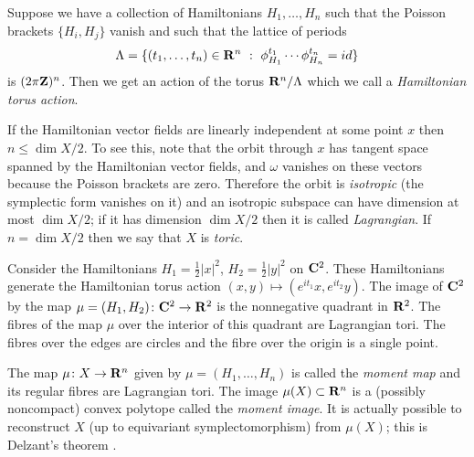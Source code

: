\documentclass{article}
\begin{document}
\begin{Definition}
Suppose we have a collection of Hamiltonians \(H_1,\ldots,H_n\) such
that the Poisson brackets \(\{H_i,H_j\}\) vanish and such that the
lattice of periods \[\Lambda=\{(t_1,\ldots,t_n)\in\mathbf{R}^n\ :\
\phi_{H_1}^{t_1}\cdots\phi_{H_n}^{t_n}=id\}\] is
\((2\pi\mathbf{Z})^n\). Then we get an action of the torus
\(\mathbf{R}^n/\Lambda\) which we call a {\em Hamiltonian torus action}.


\end{Definition}
\begin{Remark}
If the Hamiltonian vector fields are linearly independent at some
point \(x\) then \(n\leq \dim X/2\). To see this, note that the
orbit through \(x\) has tangent space spanned by the Hamiltonian
vector fields, and \(\omega\) vanishes on these vectors because the
Poisson brackets are zero. Therefore the orbit is {\em isotropic}
(the symplectic form vanishes on it) and an isotropic subspace can
have dimension at most \(\dim X/2\); if it has dimension \(\dim
X/2\) then it is called {\em Lagrangian}. If \(n=\dim X/2\) then we
say that \(X\) is {\em toric}.


\end{Remark}
\begin{Example}\label{exm:c2}
Consider the Hamiltonians \(H_1=\frac{1}{2}|x|^2\),
\(H_2=\frac{1}{2}|y|^2\) on \(\mathbf{C}^2\). These Hamiltonians generate
the Hamiltonian torus action
\((x,y)\mapsto(e^{it_1}x,e^{it_2}y)\). The image of \(\mathbf{C}^2\) by the
map \(\mu=(H_1,H_2)\colon\mathbf{C}^2\to\mathbf{R}^2\) is the nonnegative quadrant
in \(\mathbf{R}^2\). The fibres of the map \(\mu\) over the interior of
this quadrant are Lagrangian tori. The fibres over the edges are
circles and the fibre over the origin is a single point.


\end{Example}
\begin{Definition}
The map \(\mu\colon X\to\mathbf{R}^n\) given by \(\mu=(H_1,\ldots,H_n)\) is
called the {\em moment map} and its regular fibres are Lagrangian
tori. The image \(\mu(X)\subset\mathbf{R}^n\) is a (possibly noncompact)
convex polytope called the {\em moment image}. It is actually
possible to reconstruct \(X\) (up to equivariant symplectomorphism)
from \(\mu(X)\); this is Delzant's theorem {\cite[Theorem
2.1]{Delzant}}.


\end{Definition}
\end{document}
